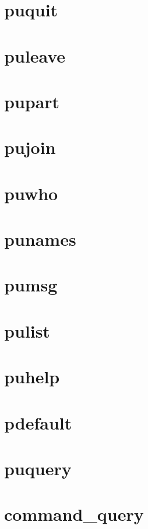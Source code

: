 \documentclass[twoside]{book}
\begin{document}
\chapter{puquit}
\label{puquit}
\hypertarget{puquit}{}

\chapter{puleave}
\label{puleave}
\hypertarget{puleave}{}

\chapter{pupart}
\label{pupart}
\hypertarget{pupart}{}

\chapter{pujoin}
\label{pujoin}
\hypertarget{pujoin}{}

\chapter{puwho}
\label{puwho}
\hypertarget{puwho}{}

\chapter{punames}
\label{punames}
\hypertarget{punames}{}

\chapter{pumsg}
\label{pumsg}
\hypertarget{pumsg}{}

\chapter{pulist}
\label{pulist}
\hypertarget{pulist}{}

\chapter{puhelp}
\label{puhelp}
\hypertarget{puhelp}{}

\chapter{pdefault}
\label{pdefault}
\hypertarget{pdefault}{}

\chapter{puquery}
\label{puquery}
\hypertarget{puquery}{}

\chapter{command\-\_\-query}
\label{command_query}
\hypertarget{command_query}{}

\end{document}
